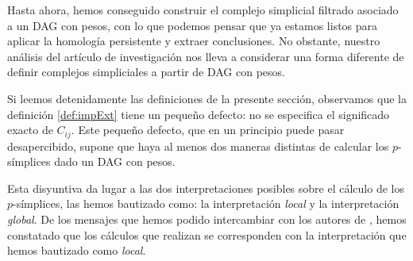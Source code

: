 \documentclass[12pt, a4paper, twoside]{book}
\numberwithin{equation}{section}
\theoremstyle{definition}
\theoremstyle{remark}
\theoremstyle{plain}
\begin{document}
	Hasta ahora, hemos conseguido construir el complejo simplicial 
	filtrado asociado a un DAG con pesos, con lo que podemos pensar que ya 
	estamos listos para aplicar la homología persistente y extraer 
	conclusiones. No obstante, nuestro análisis del artículo de 
	investigación \cite{Articulo-Watanabe} nos lleva a considerar una 
	forma diferente de definir complejos simpliciales a partir de DAG con 
	pesos.
	
	Si leemos detenidamente las definiciones de la presente sección, 
	observamos que la definición \ref{def:impExt} tiene un pequeño 
	defecto: no 
	se especifica el significado exacto de $C_{ij}$. Este pequeño defecto, 
	que en un principio puede pasar desapercibido, supone que haya al 
	menos dos maneras distintas de calcular los $p$-símplices dado un DAG 
	con pesos.

	Esta disyuntiva da lugar a las dos interpretaciones posibles sobre el
	cálculo de los $p$-símplices, las hemos bautizado como: la 
	interpretación \emph{local} y la interpretación \emph{global}. De los 
	mensajes que hemos podido intercambiar con los autores de 
	\cite{Articulo-Watanabe}, hemos constatado que los cálculos que 
	realizan se corresponden con la interpretación que hemos bautizado 
	como \emph{local}.
\end{document}

